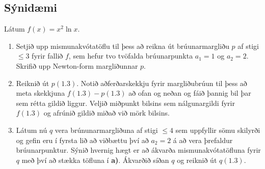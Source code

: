 \documentclass[letterpaper,10pt,icelandic]{sphinxmanual}
\begin{document}
\subsection{Sýnidæmi}
\label{kafli03:id10}
Látum \(f(x)=x^2\ln x\).
\begin{enumerate}
\item {} 
Setjið upp mismunakvótatöflu til þess að reikna út brúunarmargliðu
\(p\) af stigi \(\leq 3\) fyrir fallið \(f\), sem hefur tvo
tvöfalda brúunarpunkta \(a_1=1\) og \(a_2=2\). Skrifið upp
Newton-form margliðunnar \(p\).

\item {} 
Reiknið út \(p(1.3)\). Notið aðferðarskekkju fyrir margliðubrúun
til þess að meta skekkjuna \(f(1.3)-p(1.3)\) að ofan og neðan og
fáið þannig bil þar sem rétta gildið liggur. Veljið miðpunkt bilsins sem
nálgunargildi fyrir \(f(1.3)\) og afrúnið gildið miðað við mörk
bilsins.

\item {} 
Látum nú \(q\) vera brúnunarmargliðuna af stigi \(\leq 4\) sem
uppfyllir sömu skilyrði og gefin eru í fyrsta lið að viðbættu því að
\(a_2=2\) á að vera þrefaldur brúunarpunktur. Sýnið hvernig hægt er
að ákvarða mismunakvótatöfluna fyrir \(q\) með því að stækka töfluna
í \textbf{a)}. Ákvarðið síðan \(q\) og reiknið út \(q(1.3)\).

\end{enumerate}
\end{document}
